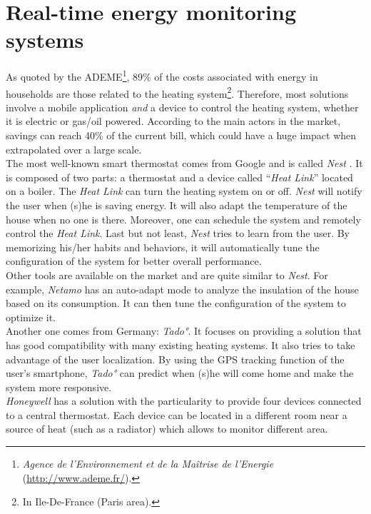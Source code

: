 \documentclass[a4paper, oneside, 11pt]{book}
\begin{document}
\section{Real-time energy monitoring systems}
As quoted by the ADEME\footnote{\textit{Agence de l'Environnement et de la Maîtrise de l'Energie} (\url{http://www.ademe.fr/}).}, 89\% of the costs associated with energy in households are those related to the heating system\footnote{In Ile-De-France (Paris area).}. Therefore, most solutions involve a mobile application \emph{and} a device to control the heating system, whether it is electric or gas/oil powered. According to the main actors in the market, savings can reach 40\% of the current bill, which could have a huge impact when extrapolated over a large scale.\\

The most well-known smart thermostat comes from Google and is called \textit{Nest} \cite{01net:online}. It is composed of two parts: a thermostat and a device called “\textit{Heat Link}” located on a boiler. The \textit{Heat Link} can turn the heating system on or off. \textit{Nest} will notify the user when (s)he is saving energy. It will also adapt the temperature of the house when no one is there. Moreover, one can schedule the system and remotely control the \textit{Heat Link}. Last but not least, \textit{Nest} tries to learn from the user. By memorizing his/her habits and behaviors, it will automatically tune the configuration of the system for better overall performance.\\

Other tools are available on the market and are quite similar to \textit{Nest}. For example, \textit{Netamo} has an auto-adapt mode to analyze the insulation of the house based on its consumption. It can then tune the configuration of the system to optimize it.\\

Another one comes from Germany: \textit{Tado°}. It focuses on providing a solution that has good compatibility with many existing heating systems. It also tries to take advantage of the user localization. By using the GPS tracking function of the user’s smartphone, \textit{Tado°} can predict when (s)he will come home and make the system more responsive. \\

\textit{Honeywell} has a solution with the particularity to provide four devices connected to a central thermostat. Each device can be located in a different room near a source of heat (such as  a radiator) which allows to monitor different area. \\
\end{document}
